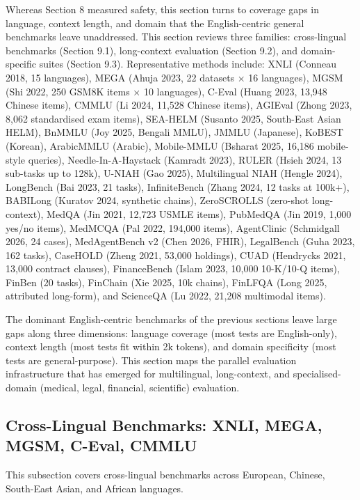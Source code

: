 Whereas Section 8 measured safety, this section turns to coverage gaps in language, context length, and domain that the English-centric general benchmarks leave unaddressed. This section reviews three families: cross-lingual benchmarks (Section 9.1), long-context evaluation (Section 9.2), and domain-specific suites (Section 9.3). Representative methods include: XNLI (Conneau 2018, 15 languages), MEGA (Ahuja 2023, 22 datasets × 16 languages), MGSM (Shi 2022, 250 GSM8K items × 10 languages), C-Eval (Huang 2023, 13,948 Chinese items), CMMLU (Li 2024, 11,528 Chinese items), AGIEval (Zhong 2023, 8,062 standardised exam items), SEA-HELM (Susanto 2025, South-East Asian HELM), BnMMLU (Joy 2025, Bengali MMLU), JMMLU (Japanese), KoBEST (Korean), ArabicMMLU (Arabic), Mobile-MMLU (Bsharat 2025, 16,186 mobile-style queries), Needle-In-A-Haystack (Kamradt 2023), RULER (Hsieh 2024, 13 sub-tasks up to 128k), U-NIAH (Gao 2025), Multilingual NIAH (Hengle 2024), LongBench (Bai 2023, 21 tasks), InfiniteBench (Zhang 2024, 12 tasks at 100k+), BABILong (Kuratov 2024, synthetic chains), ZeroSCROLLS (zero-shot long-context), MedQA (Jin 2021, 12,723 USMLE items), PubMedQA (Jin 2019, 1,000 yes/no items), MedMCQA (Pal 2022, 194,000 items), AgentClinic (Schmidgall 2026, 24 cases), MedAgentBench v2 (Chen 2026, FHIR), LegalBench (Guha 2023, 162 tasks), CaseHOLD (Zheng 2021, 53,000 holdings), CUAD (Hendrycks 2021, 13,000 contract clauses), FinanceBench (Islam 2023, 10,000 10-K/10-Q items), FinBen (20 tasks), FinChain (Xie 2025, 10k chains), FinLFQA (Long 2025, attributed long-form), and ScienceQA (Lu 2022, 21,208 multimodal items).

The dominant English-centric benchmarks of the previous sections leave large gaps along three dimensions: language coverage (most tests are English-only), context length (most tests fit within 2k tokens), and domain specificity (most tests are general-purpose). This section maps the parallel evaluation infrastructure that has emerged for multilingual, long-context, and specialised-domain (medical, legal, financial, scientific) evaluation.

\subsection{Cross-Lingual Benchmarks: XNLI, MEGA, MGSM, C-Eval, CMMLU}\label{cross-lingual-benchmarks-xnli-mega-mgsm-c-eval-cmmlu}

This subsection covers cross-lingual benchmarks across European, Chinese, South-East Asian, and African languages.

